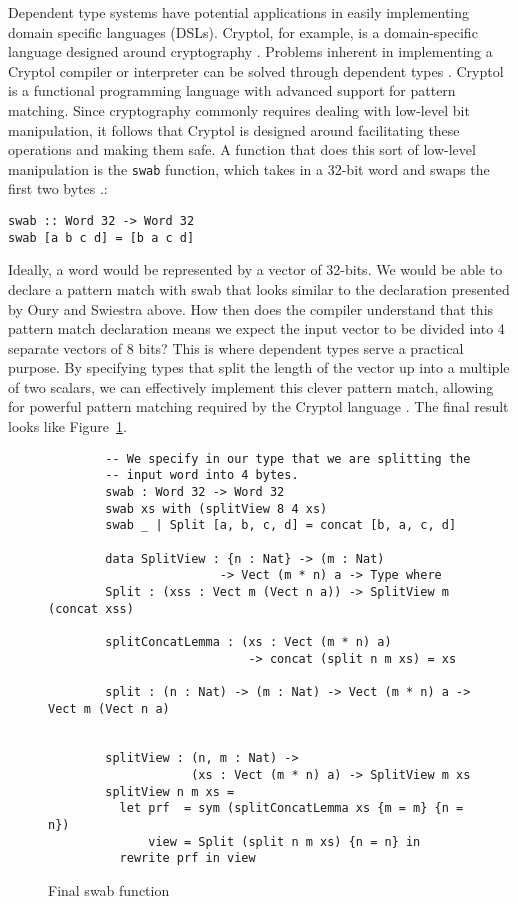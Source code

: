 Dependent type systems have potential applications in easily implementing domain
specific languages (DSLs). Cryptol, for example, is a domain-specific language
designed around cryptography \cite{cryptol_manual}. Problems inherent in
implementing a Cryptol compiler or interpreter can be solved through dependent
types \cite{power_of_pi}. Cryptol is a functional programming language with
advanced support for pattern matching. Since cryptography commonly requires
dealing with low-level bit manipulation, it follows that Cryptol is designed
around facilitating these operations and making them safe. A function that does
this sort of low-level manipulation is the \texttt{swab} function, which takes
in a 32-bit word and swaps the first two bytes \cite{cryptol_manual}.: 

\texttt{swab :: Word 32 -> Word 32}\\
\texttt{swab [a b c d] = [b a c d]}

Ideally, a word would be represented by a vector of 32-bits. We would be able to
declare a pattern match with swab that looks similar to the declaration
presented by Oury and Swiestra above. How then does the compiler understand that
this pattern match declaration means we expect the input vector to be divided
into 4 separate vectors of 8 bits? This is where dependent types serve a
practical purpose. By specifying types that split the length of the vector up
into a multiple of two scalars, we can effectively implement this clever pattern
match, allowing for powerful pattern matching required by the Cryptol language
\cite{power_of_pi}. The final result looks like Figure~\ref{swab}. 

\begin{figure}[ht!]
    \caption{Final swab function \protect\cite{power_of_pi}}
    \label{swab}
    \begin{lstlisting}
        -- We specify in our type that we are splitting the
        -- input word into 4 bytes. 
        swab : Word 32 -> Word 32
        swab xs with (splitView 8 4 xs)
        swab _ | Split [a, b, c, d] = concat [b, a, c, d]

        data SplitView : {n : Nat} -> (m : Nat) 
                        -> Vect (m * n) a -> Type where
        Split : (xss : Vect m (Vect n a)) -> SplitView m (concat xss)
        
        splitConcatLemma : (xs : Vect (m * n) a) 
                            -> concat (split n m xs) = xs
        
        split : (n : Nat) -> (m : Nat) -> Vect (m * n) a -> Vect m (Vect n a)


        splitView : (n, m : Nat) -> 
                    (xs : Vect (m * n) a) -> SplitView m xs
        splitView n m xs =
          let prf  = sym (splitConcatLemma xs {m = m} {n = n})
              view = Split (split n m xs) {n = n} in
          rewrite prf in view
    \end{lstlisting}
\end{figure}

